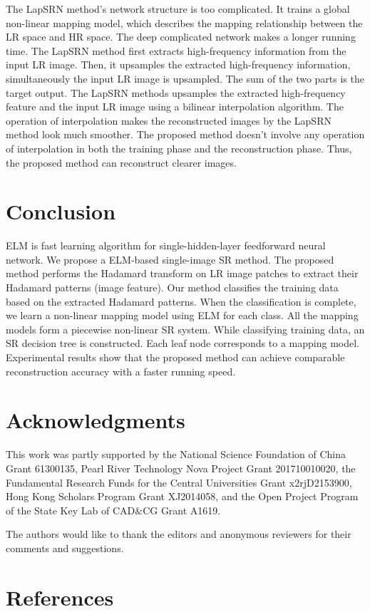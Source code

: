 \documentclass[review,numbers,sort&compress]{elsarticle}  %
\begin{document}
The LapSRN method’s network structure is too complicated. It trains a global non-linear mapping model, which describes the mapping relationship between the LR space and HR space. The deep complicated network makes a longer running time. The LapSRN method first extracts high-frequency information from the input LR image. Then, it upsamples the extracted high-frequency information, simultaneously the input LR image is upsampled. The sum of the two parts is the target output. The LapSRN methods upsamples the extracted high-frequency feature and the input LR image using a bilinear interpolation algorithm. The operation of interpolation makes the reconstructed images by the LapSRN method look much smoother. The proposed method doesn’t involve any operation of interpolation in both the training phase and the reconstruction phase. Thus, the proposed method can reconstruct clearer images.

\section{Conclusion}
ELM is fast learning algorithm for single-hidden-layer feedforward neural network. We propose a ELM-based single-image SR method. The proposed method performs the Hadamard transform on LR image patches to extract their Hadamard patterns (image feature). Our method classifies the training data based on the extracted Hadamard patterns. When the classification is complete, we learn a non-linear mapping model using ELM for each class. All the mapping models form a piecewise non-linear SR system. While classifying training data, an SR decision tree is constructed. Each leaf node corresponds to a mapping model. Experimental results show that the proposed method can achieve comparable reconstruction accuracy with a faster running speed.




\section{Acknowledgments}

This work was partly supported by the National Science Foundation of China Grant 61300135, Pearl River Technology Nova Project Grant 201710010020, the Fundamental Research Funds for the Central Universities Grant x2rjD2153900, Hong Kong Scholars Program Grant XJ2014058, and the Open Project Program of the State Key Lab of CAD$\&$CG Grant A1619.

The authors would like to thank the editors and anonymous reviewers for their comments and suggestions.


\section*{References}

%

\end{document}
